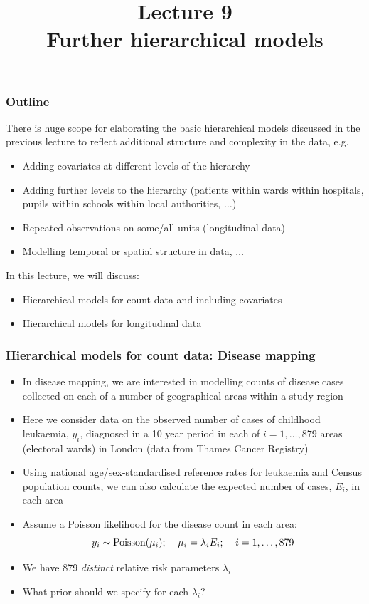 \documentclass{beamer}
\title[Introduction to Bayesian Analysis (MSc)]
{\Huge{Lecture 9 \vspace{5mm}\\Further hierarchical models}}
\author[Further Hierarchical Models]
{}
\institute[Lecture 9]
{}
\date[]
{}
\newcommand{\bi}{\begin{itemize}}
\newcommand{\ei}{\end{itemize}}
\newcommand{\I}{\item}
\newcommand{\bibig}{\begin{itemize}}
\newcommand{\eibig}{\end{itemize}}
\begin{document}
\begin{frame}[t]
  \titlepage
\end{frame}

\begin{frame}
\frametitle{Outline}
There is huge scope for elaborating the basic hierarchical models
discussed in the previous lecture to reflect additional structure and complexity
in the data, e.g.\vspace{0.5mm}
\bi
\I Adding covariates at different levels of the hierarchy\vspace{0.5mm}
\I Adding further levels to
   the hierarchy (patients within wards within hospitals,
   pupils within schools within local authorities, $\ldots$)\vspace{0.5mm}
\I Repeated observations on
   some/all units (longitudinal data)\vspace{0.5mm}
 \I Modelling temporal or spatial structure
in data, $\ldots$\vspace{1mm}
\ei
In this lecture, we will discuss:\vspace{0.5mm}
\bi
\I Hierarchical models for count data and including covariates\vspace{0.5mm}
\I Hierarchical models for longitudinal data\vspace{0.5mm}
\ei
\end{frame}

\begin{frame}
\frametitle{Hierarchical models for count data: Disease mapping}
\bibig
\I In disease mapping, we are interested in modelling counts of disease cases
   collected on each of a number of geographical areas within a study
   region\vspace{1mm}
\I Here we consider data on the observed number of cases of childhood leukaemia, $y_i$, diagnosed in a 10 year period
   in each of $i=1,\ldots,879$ areas (electoral wards) in London (data from Thames Cancer Registry)\vspace{1mm}
\I Using national age/sex-standardised reference rates for leukaemia and Census population counts, we can also calculate the
    expected number of cases, $E_i$, in each area\vspace{1mm}
\I Assume a Poisson likelihood for the disease count in each area:
   $$y_i \sim \hbox{Poisson}(\mu_i); \;\;\;\; \mu_i = \lambda_i E_i; \;\;\;\; i=1,\ldots,879$$
\I We have 879 {\it distinct} relative risk parameters
$\lambda_i$\vspace{1mm}
\I What prior should we specify for each $\lambda_i$?
\eibig
\end{frame}
\end{document}

